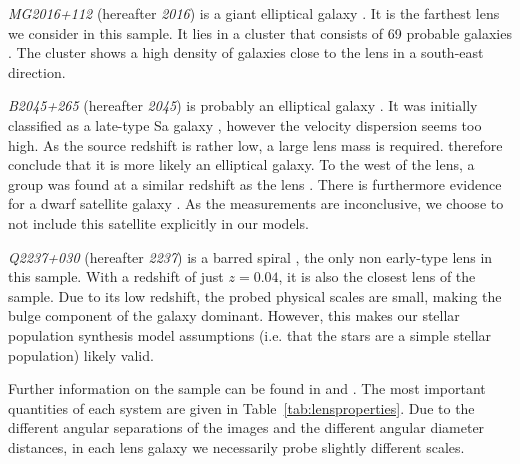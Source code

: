\documentclass[useAMS,usenatbib]{mn2e}
\begin{document}
\textit{MG2016+112} (hereafter \textit{2016}) is a giant elliptical galaxy \citep{1984Sci...223...46L,1986AJ.....91..991S}. It is the farthest lens we consider in this sample. It lies in a cluster that consists of 69 probable galaxies \citep{2003MNRAS.344..337T}. The cluster shows a high density of galaxies close to the lens in a south-east direction.

\textit{B2045+265} (hereafter \textit{2045}) is probably an elliptical galaxy \citep{2007MNRAS.378..109M}. It was initially classified as a late-type Sa galaxy \citep{1999AJ....117..658F}, however the velocity dispersion seems too high. As the source redshift is rather low, a large lens mass is required. \cite{2007MNRAS.378..109M} therefore conclude that it is more likely an elliptical galaxy. To the west of the lens, a group was found at a similar redshift as the lens \citep{1999AJ....117..658F}. There is furthermore evidence for a dwarf satellite galaxy \citep{2007MNRAS.378..109M}. As the measurements are inconclusive, we choose to not include this satellite explicitly in our models.

\textit{Q2237+030} (hereafter \textit{2237}) is a barred spiral \citep{1988AJ.....95.1331Y}, the only non early-type lens in this sample. With a redshift of just $z=0.04$, it is also the closest lens of the sample. Due to its low redshift, the probed physical scales are small, making the bulge component of the galaxy dominant. However, this makes our stellar population synthesis model assumptions (i.e. that the stars are a simple stellar population) likely valid. 

Further information on the sample can be found in \citet{2011ApJ...740...97L} and \citet{2012A&A...538A..99S}. The most important quantities of each system are given in Table~\ref{tab:lensproperties}. Due to the different angular separations of the images and the different angular diameter distances, in each lens galaxy we necessarily probe slightly different scales.
\end{document}
